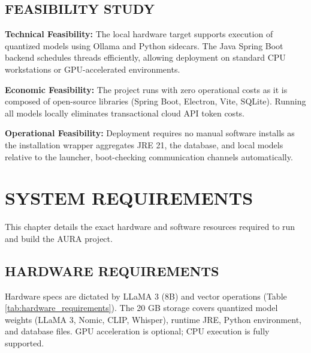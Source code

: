 \documentclass[12pt,a4paper]{report}
\begin{document}
\section{FEASIBILITY STUDY}

\noindent\textbf{Technical Feasibility:} The local hardware target supports execution of quantized models using Ollama and Python sidecars. The Java Spring Boot backend schedules threads efficiently, allowing deployment on standard CPU workstations or GPU-accelerated environments.

\vspace{0.2cm}
\noindent\textbf{Economic Feasibility:} The project runs with zero operational costs as it is composed of open-source libraries (Spring Boot, Electron, Vite, SQLite). Running all models locally eliminates transactional cloud API token costs.

\vspace{0.2cm}
\noindent\textbf{Operational Feasibility:} Deployment requires no manual software installs as the installation wrapper aggregates JRE 21, the database, and local models relative to the launcher, boot-checking communication channels automatically.

\chapter{SYSTEM REQUIREMENTS}
\label{ch:system_requirements}

This chapter details the exact hardware and software resources required to run and build the AURA project.

\section{HARDWARE REQUIREMENTS}
Hardware specs are dictated by LLaMA 3 (8B) and vector operations (Table \ref{tab:hardware_requirements}). The 20 GB storage covers quantized model weights (LLaMA 3, Nomic, CLIP, Whisper), runtime JRE, Python environment, and database files. GPU acceleration is optional; CPU execution is fully supported.
\end{document}
